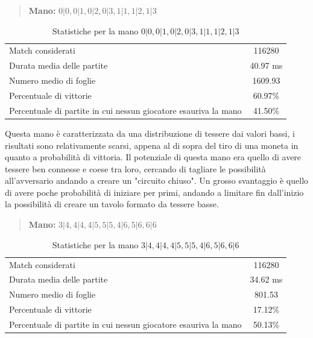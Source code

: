 \documentclass[a4paper,12pt]{report} %
\begin{document}
\begin{quote}
    \textbf{Mano:} \(0|0, 0|1, 0|2, 0|3, 1|1, 1|2, 1|3\)
\end{quote}

\begin{table}[h!]
    \centering
    \begin{tabular}{|l|c|}
        \hline
        Match considerati & 116280 \\
        Durata media delle partite & 40.97 ms \\
        Numero medio di foglie & 1609.93 \\
        Percentuale di vittorie & 60.97\% \\
        Percentuale di partite in cui nessun giocatore esauriva la mano & 41.50\% \\
        \hline
    \end{tabular}
    \caption{Statistiche per la mano \(0|0, 0|1, 0|2, 0|3, 1|1, 1|2, 1|3\)}
    \label{tab:stats_1}
\end{table}

Questa mano è caratterizzata da una distribuzione di tessere dai valori bassi, i risultati sono relativamente scarsi, appena al di sopra del tiro di una moneta in quanto a probabilità di vittoria.
Il potenziale di questa mano era quello di avere tessere ben connesse e coese tra loro, cercando di tagliare le possibilità all'avversario andando a creare un "circuito chiuso".
Un grosso svantaggio è quello di avere poche probabilità di iniziare per primi, andando a limitare fin dall'inizio la possibilità di creare un tavolo formato da tessere basse.


\begin{quote}
    \textbf{Mano:} \(3|4, 4|4, 4|5, 5|5, 4|6, 5|6, 6|6\)
\end{quote}

\begin{table}[h!]
    \centering
    \begin{tabular}{|l|c|}
        \hline
        Match considerati & 116280 \\
        Durata media delle partite & 34.62 ms \\
        Numero medio di foglie & 801.53 \\
        Percentuale di vittorie & 17.12\% \\
        Percentuale di partite in cui nessun giocatore esauriva la mano & 50.13\% \\
        \hline
    \end{tabular}
    \caption{Statistiche per la mano \(3|4, 4|4, 4|5, 5|5, 4|6, 5|6, 6|6\)}
    \label{tab:stats_1}
\end{table}
\end{document}
